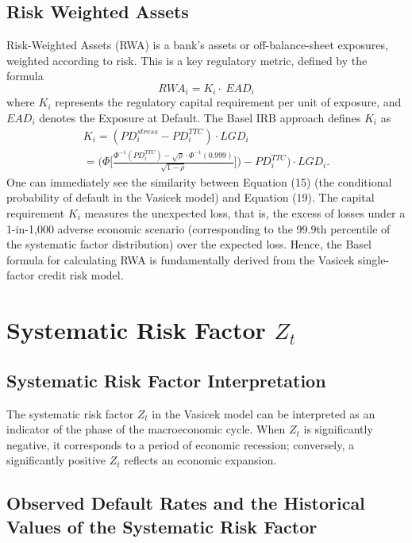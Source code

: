 \documentclass[11pt,a4paper]{article}
\begin{document}
\subsection{Risk Weighted Assets}

Risk-Weighted Assets (RWA) is a bank's assets or off-balance-sheet exposures, weighted according to risk. This is a key regulatory metric, defined by the formula
\begin{equation}
RWA_i = K_i \cdot \ EAD_i
\end{equation}
where $K_i$ represents the regulatory capital requirement per unit of exposure, and $EAD_i$ denotes the Exposure at Default. The Basel IRB approach defines $K_i$ as
\begin{multline}
K_i = (PD_i^{stress} - PD_i^{TTC}) \cdot LGD_i \\
= \Bigg(\Phi \Bigg[\frac{\Phi^{-1}(PD_i^{TTC}) - \sqrt{\rho} \cdot \Phi^{-1}(0.999)}{\sqrt{1 - \rho}} \Bigg] \Bigg) - PD_i^{TTC} \Bigg) \cdot LGD_i.
\end{multline}
One can immediately see the similarity between Equation (15) (the conditional probability of default in the Vasicek model) and Equation (19). The capital requirement $K_i$ measures the unexpected loss, that is, the excess of losses under a 1-in-1,000 adverse economic scenario (corresponding to the 99.9th percentile of the systematic factor distribution) over the expected loss. Hence, the Basel formula for calculating RWA is fundamentally derived from the Vasicek single-factor credit risk model.

\section{Systematic Risk Factor $Z_t$}

\subsection{Systematic Risk Factor Interpretation}

The systematic risk factor $Z_t$ in the Vasicek model can be interpreted as an indicator of the phase of the macroeconomic cycle.
When $Z_t$ is significantly negative, it corresponds to a period of economic recession; conversely, a significantly positive $Z_t$ reflects an economic expansion.

\subsection{Observed Default Rates and the Historical Values of the Systematic Risk Factor}
\end{document}
